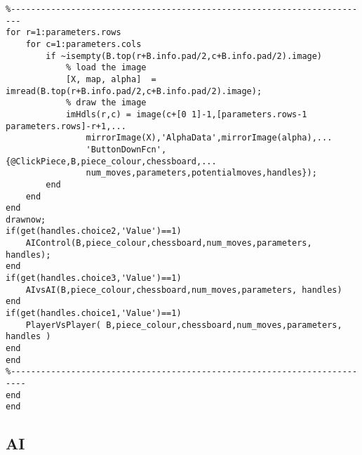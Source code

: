 \documentclass{article}
\begin{document}
\begin{lstlisting}
%------------------------------------------------------------------------
for r=1:parameters.rows
    for c=1:parameters.cols
        if ~isempty(B.top(r+B.info.pad/2,c+B.info.pad/2).image)
            % load the image
            [X, map, alpha]  = imread(B.top(r+B.info.pad/2,c+B.info.pad/2).image);
            % draw the image
            imHdls(r,c) = image(c+[0 1]-1,[parameters.rows-1 parameters.rows]-r+1,...
                mirrorImage(X),'AlphaData',mirrorImage(alpha),...
                'ButtonDownFcn',{@ClickPiece,B,piece_colour,chessboard,...
                num_moves,parameters,potentialmoves,handles});
        end
    end
end
drawnow;
if(get(handles.choice2,'Value')==1)
    AIControl(B,piece_colour,chessboard,num_moves,parameters, handles);
end
if(get(handles.choice3,'Value')==1)
    AIvsAI(B,piece_colour,chessboard,num_moves,parameters, handles)
end
if(get(handles.choice1,'Value')==1)
    PlayerVsPlayer( B,piece_colour,chessboard,num_moves,parameters, handles )
end
end
%-------------------------------------------------------------------------
end
end
\end{lstlisting}

\subsection{AI}
\end{document}
